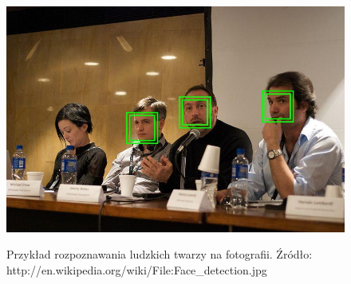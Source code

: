 \begin{figure}[!ht]
 \begin{center}
  \scalebox{0.25}
  {
   \includegraphics{figures/face_detection.jpg}
  }
 \end{center}
 \caption{
  Przykład rozpoznawania ludzkich twarzy na fotografii.
  Źródło: http://en.wikipedia.org/wiki/File:Face\_detection.jpg
 }
 \label{fig:face_detection}
\end{figure}
